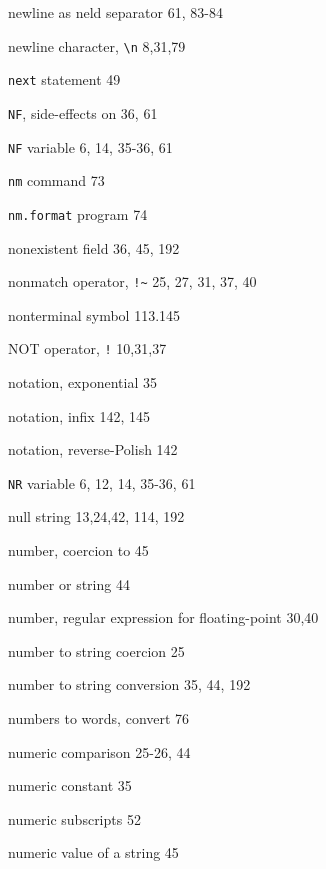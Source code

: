 \begin{multicols}{3}
\hangindent=3pc  newline as neld separator 61,  83-84

\hangindent=3pc  newline character, \verb'\n' 8,31,79

\hangindent=3pc  \verb'next' statement 49

\hangindent=3pc  \verb'NF', side-effects on 36, 61

\hangindent=3pc  \verb'NF' variable 6, 14, 35-36, 61

\hangindent=3pc  \verb'nm' command 73

\hangindent=3pc  \verb'nm.format' program 74


\hangindent=3pc  nonexistent field 36, 45, 192

\hangindent=3pc  nonmatch operator, \verb'!~' 25, 27, 31, 37, 40

\hangindent=3pc  nonterminal symbol 113.145

\hangindent=3pc  NOT operator, \verb'!' 10,31,37

\hangindent=3pc  notation, exponential 35

\hangindent=3pc  notation, infix 142, 145

\hangindent=3pc  notation, reverse-Polish 142

\hangindent=3pc  \verb'NR' variable 6, 12, 14, 35-36, 61

\hangindent=3pc  null string 13,24,42, 114, 192

\hangindent=3pc  number, coercion to 45

\hangindent=3pc  number or string 44

\hangindent=3pc  number, regular expression for floating-point 30,40

\hangindent=3pc  number to string coercion 25

\hangindent=3pc  number to string conversion 35,  44, 192

\hangindent=3pc  numbers to words, convert 76

\hangindent=3pc  numeric comparison 25-26, 44

\hangindent=3pc  numeric constant 35

\hangindent=3pc  numeric subscripts 52

\hangindent=3pc  numeric value of a string 45


\end{multicols}
